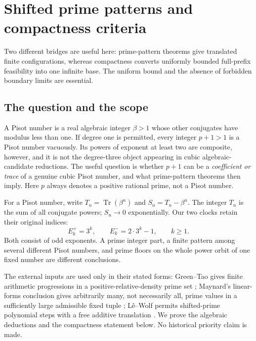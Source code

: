 \documentclass[11pt,a4paper]{article}
\theoremstyle{definition}\newtheorem{definition}[theorem]{Definition}
\theoremstyle{remark}\newtheorem{remark}[theorem]{Remark}
\DeclareMathOperator{\Tr}{Tr}\DeclareMathOperator{\tr}{tr}\DeclareMathOperator{\Nm}{N}
\begin{document}
\endgroup

\section{Shifted prime patterns and compactness criteria}\label{src:R09}
Two different bridges are useful here: prime-pattern theorems give translated finite configurations, whereas compactness converts uniformly bounded full-prefix feasibility into one infinite base. The uniform bound and the absence of forbidden boundary limits are essential.
\medskip
\begingroup



\subsection{The question and the scope}

A Pisot number is a real algebraic integer $\beta>1$ whose other
conjugates have modulus less than one. If degree one is permitted,
every integer $p+1>1$ is a Pisot number vacuously. Its powers of exponent
at least two are composite, however, and it is not the degree-three
object appearing in cubic algebraic-candidate reductions. The useful
question is whether $p+1$ can be a \emph{coefficient or trace} of a
genuine cubic Pisot number, and what prime-pattern theorems then imply.
Here $p$ always denotes a positive rational prime, not a Pisot number.

For a Pisot number, write $T_n=\Tr(\beta^n)$ and
$S_n=T_n-\beta^n$. The integer $T_n$ is the sum of all conjugate powers;
$S_n\to0$ exponentially. Our two clocks retain their original indices:
\begin{equation}\label{R09:eq:clocks}
 E_k^+=3^k,\qquad E_k^-=2\cdot3^k-1,\qquad k\ge1.
\end{equation}
Both consist of odd exponents. A prime integer part, a finite pattern
among several different Pisot numbers, and prime floors on the whole
power orbit of one fixed number are different conclusions.

The external inputs are used only in their stated forms:
Green--Tao gives finite arithmetic progressions in a positive-relative-density
prime set \cite[Theorems 1.1--1.2]{GreenTao}; Maynard's linear-forms conclusion
gives arbitrarily many, not necessarily all, prime values in a
sufficiently large admissible fixed tuple \cite[p.~2]{Maynard};
L\^e--Wolf permits shifted-prime polynomial steps with a free additive
translation \cite[Theorem 4]{R09-LW}. We prove the algebraic deductions
and the compactness statement below. No historical priority claim is made.
\end{document}
